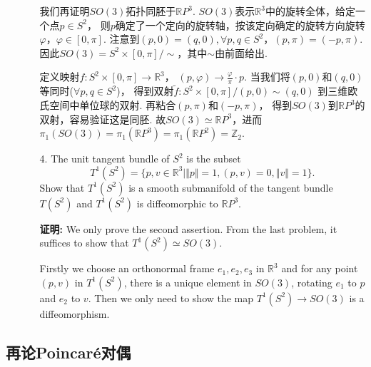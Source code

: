\begin{itemize}
\begin{enumerate}
            \qquad 我们再证明$SO(3)$拓扑同胚于$\mathbb{R}P^3$. 
            $SO(3)$表示$\mathbb{R}^3$中的旋转全体，给定一个点$p\in S^2$，
            则$p$确定了一个定向的旋转轴，按该定向确定的旋转方向旋转$\varphi$，$\varphi\in [0,\pi]$.
            注意到$(p,0)=(q,0), \forall p,q\in S^2$，$(p,\pi)=(-p,\pi)$. 
            因此$SO(3)=S^2\times [0,\pi]/\sim$，其中$\sim$由前面给出.

            \qquad 定义映射$f:S^2\times [0,\pi] \rightarrow \mathbb{R}^3$，
            $(p,\varphi)\rightarrow \frac{\varphi}{\pi}\cdot p$. 
            当我们将$(p,0)$和$(q,0)$等同时($\forall p,q\in S^2$)，
            得到双射$\tilde{f}:S^2\times [0,\pi]/(p,0)\sim (q,0)$
            到三维欧氏空间中单位球的双射. 再粘合$(p,\pi)$和$(-p,\pi)$，
            得到$SO(3)$到$\mathbb{R}P^3$的双射，容易验证这是同胚. 
            故$SO(3)\simeq \mathbb{R}P^3$，进而
            $\pi_1(SO(3))=\pi_1(\mathbb{R}P^3)
            =\pi_1(\mathbb{R}P^2)=\mathbb{Z}_2$.

            \item[4.] The unit tangent bundle of $S^2$ is the subset   
            $$T^1(S^2)=\{p,v\in \mathbb{R}^3 \mid \Vert p\Vert=1, (p,v)=0, \Vert v\Vert=1\}.$$
            Show that $T^1(S^2)$ is a smooth submanifold of the tangent bundle $T(S^2)$ 
            and $T^1(S^2)$ is diffeomorphic to $\mathbb{R}P^3$.
            \item[\textbf{证明:}] \qquad We only prove the second assertion. 
            From the last problem, it suffices to show that 
            $T^1(S^2)\simeq SO(3)$.\par
            \qquad Firstly we choose an orthonormal frame $e_1,e_2,e_3$ 
            in $\mathbb{R}^3$ and for any point $(p,v)$ in $T^1(S^2)$, 
            there is a unique element in $SO(3)$, rotating $e_1$ to $p$ 
            and $e_2$ to $v$. Then we only need to show the map 
            $T^1(S^2)\rightarrow SO(3)$ is a diffeomorphism.
        \end{enumerate}
\end{itemize}

\subsection{再论Poincaré对偶}

